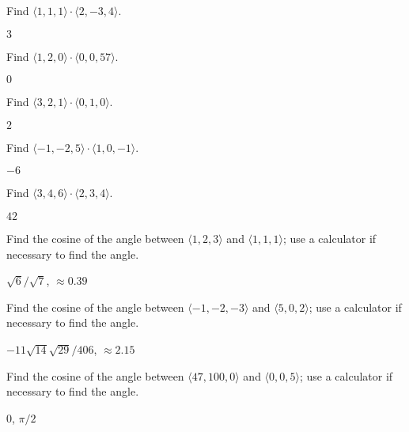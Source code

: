 \begin{enumialphparenastyle}

\begin{ex}
Find $\langle 1,1,1\rangle\cdot\langle 2,-3,4\rangle$.
\begin{sol}
	$3$
\end{sol}
\end{ex}

\begin{ex}
Find $\langle 1,2,0\rangle\cdot\langle 0,0,57\rangle$.
\begin{sol}
	$0$
\end{sol}
\end{ex}

\begin{ex}
Find $\langle 3,2,1\rangle\cdot\langle 0,1,0\rangle$.
\begin{sol}
	$2$
\end{sol}
\end{ex}

\begin{ex}
Find $\langle -1,-2,5\rangle\cdot\langle 1,0,-1 \rangle$.
\begin{sol}
	$-6$
\end{sol}
\end{ex}

\begin{ex}
Find $\langle 3,4,6\rangle\cdot\langle 2,3,4\rangle$.
\begin{sol}
	$42$
\end{sol}
\end{ex}

\begin{ex}
Find the cosine of the angle between $\langle 1,2,3\rangle$
and $\langle 1,1,1\rangle$; use a calculator if necessary to find the angle.
\begin{sol}
	$\sqrt6/\sqrt7$, $\approx 0.39$
\end{sol}
\end{ex}

\begin{ex}
Find the cosine of the angle between $\langle -1, -2,-3\rangle$
and $\langle 5,0,2\rangle$; use a calculator if necessary to find the angle.
\begin{sol}
	$-11\sqrt{14}\sqrt{29}/406$, $\approx 2.15$
\end{sol}
\end{ex}

\begin{ex}
Find the cosine of the angle between $\langle 47,100,0\rangle$
and $\langle 0,0,5\rangle$; use a calculator if necessary to find the angle.
\begin{sol}
	$0$, $\pi/2$
\end{sol}
\end{ex}


\end{enumialphparenastyle}
